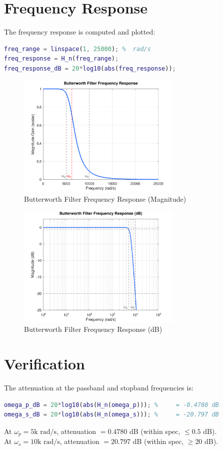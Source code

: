 \documentclass[12pt]{article}
\begin{document}
\section*{Frequency Response}
The frequency response is computed and plotted:
\begin{lstlisting}[language=Matlab, caption={Frequency Response Plot}]
freq_range = linspace(1, 25000); %  rad/s
freq_response = H_n(freq_range); 
freq_response_dB = 20*log10(abs(freq_response));
\end{lstlisting}
\begin{figure}[H]
    \centering
    \includegraphics[width=0.7\textwidth]{freq_response.png}
    \caption{Butterworth Filter Frequency Response (Magnitude)}
\end{figure}
\begin{figure}[H]
    \centering
    \includegraphics[width=0.7\textwidth]{filter_bode_plot.png}
    \caption{Butterworth Filter Frequency Response (dB)}
\end{figure}


\section*{Verification}
The attenuation at the passband and stopband frequencies is:
\begin{lstlisting}[language=Matlab, caption={Attenuation at Key Frequencies}]
omega_p_dB = 20*log10(abs(H_n(omega_p))); %     = -0.4780 dB
omega_s_dB = 20*log10(abs(H_n(omega_s))); %     = -20.797 dB
\end{lstlisting}
At $\omega_p = 5\text{k rad/s}$, attenuation $= 0.4780$ dB (within spec, $\leq 0.5$ dB).\\
At $\omega_s = 10\text{k rad/s}$, attenuation $= 20.797$ dB (within spec, $\geq 20$ dB).
\end{document}
